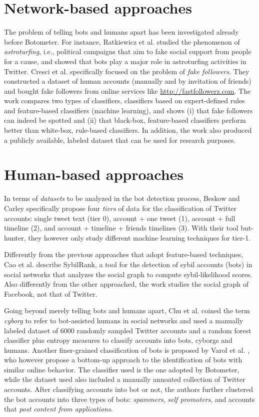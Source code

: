 \section{Network-based approaches}
The problem of telling bots and humans apart has been investigated already before Botometer. For instance, Ratkiewicz et al. \cite{ratkiewicz2011detecting} studied the phenomenon of \emph{astroturfing}, i.e., political campaigns that aim to fake social support from people for a cause, and showed that bots play a major role in astroturfing activities in Twitter. Cresci et al. \cite{cresci2015fame} specifically
focused on the problem of \emph{fake followers}. They constructed a dataset of human accounts (manually and by invitation of friends) and bought fake followers from online services like \url{http://fastfollowerz.com}. The work compares two types of classifiers, classifiers based on expert-defined rules and feature-based classifiers (machine learning), and shows (i) that fake followers 
can indeed be spotted and (ii) that black-box, feature-based classifiers perform better than white-box, rule-based classifiers. In addition, the work also produced a publicly available, labeled dataset that can be used for research purposes.

\section{Human-based approaches}
In terms of \emph{datasets} to be analyzed in the bot detection process, Beskow and Carley \cite{Beskow2018} specifically propose four \emph{tiers} of data for the classification of Twitter accounts: single tweet text (tier 0), account + one tweet (1), account + full timeline (2), and account + timeline + friends timelines (3). With their tool but-hunter, they however only study different machine learning techniques for tier-1.

Differently from the previous approaches that adopt feature-based techniques, Cao et al. \cite{cao2012aiding} describe SybilRank, a tool for the detection of sybil accounts (bots) in social networks that analyzes the social graph to compute sybil-likelihood scores. Also differently from the other approached, the work studies the social graph of Facebook, not that of Twitter.

Going beyond merely telling bots and humans apart, Chu et al. \cite{chu2012detecting} coined the term \emph{cyborg} to refer to bot-assisted humans in  social networks and used a manually labeled dataset of 6000 randomly sampled Twitter accounts and a random forest classifier plus entropy measures to classify accounts into bots, cyborgs and humans. Another finer-grained classification of bots is proposed by Varol et al. \cite{varol2017online}, who however propose a bottom-up approach to the identification of bots with similar online behavior. The classifier used is the one adopted by Botometer, while the dataset used also included a manually annoated collection of Twitter accounts. After classifying accounts into bot or not, the authors further clustered the bot accounts into three types of bots: \emph{spammers}, \textit{self promoters}, and accounts that \textit{post content from applications}.


